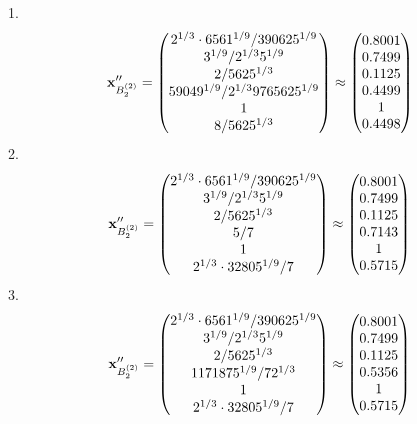 \documentclass[10pt,a4paper]{article}
\begin{document}
	1.
	\[
		\bold{x}''_{B_2^{(2)}} = 
		\begin{pmatrix}
			{{2^ {1 / 3}} \cdot {6561^ {1 / 9}}} / {{390625^ {1 / 9}}} \\
			{{3^ {1 / 9}}} / {{2^ {1 / 3}}{5^ {1 / 9}}} \\
			{{2}} / {{5625^ {1 / 3}}} \\
			{{59049^ {1 / 9}}} / {{2^ {1 / 3}}{9765625^ {1 / 9}}} \\
			{1}{} \\
			{{8}} / {{5625^ {1 / 3}}} \\
		\end{pmatrix}
		\approx
		\begin{pmatrix}
			0.8001   \\
			0.7499   \\
			0.1125   \\
			0.4499   \\
			1        \\
			0.4498   \\
		\end{pmatrix}
	\]
	2.
	\[
		\bold{x}''_{B_2^{(2)}} = 
		\begin{pmatrix}
			{{2^ {1 / 3}} \cdot {6561^ {1 / 9}}} / {{390625^ {1 / 9}}} \\
			{{3^ {1 / 9}}} / {{2^ {1 / 3}}{5^ {1 / 9}}} \\
			{{2}} / {{5625^ {1 / 3}}} \\
			{{5}} / {{7}} \\
			{1}{} \\
			{{2^ {1 / 3}} \cdot {32805^ {1 / 9}}} / {{7}} \\
		\end{pmatrix}
		\approx
		\begin{pmatrix}
			0.8001   \\
			0.7499   \\
			0.1125   \\
			0.7143   \\
			1        \\
			0.5715   \\
		\end{pmatrix}
	\]
	3.
	\[
		\bold{x}''_{B_2^{(2)}} = 
		\begin{pmatrix}
			{{2^ {1 / 3}} \cdot {6561^ {1 / 9}}} / {{390625^ {1 / 9}}} \\
			{{3^ {1 / 9}}} / {{2^ {1 / 3}}{5^ {1 / 9}}} \\
			{{2}} / {{5625^ {1 / 3}}} \\
			{{1171875^ {1 / 9}}} / {{7}{2^ {1 / 3}}} \\
			{1}{} \\
			{{2^ {1 / 3}} \cdot {32805^ {1 / 9}}} / {{7}} \\
		\end{pmatrix}
		\approx
		\begin{pmatrix}
			0.8001   \\
			0.7499   \\
			0.1125   \\
			0.5356   \\
			1        \\
			0.5715   \\
		\end{pmatrix}
	\]
\end{document}
